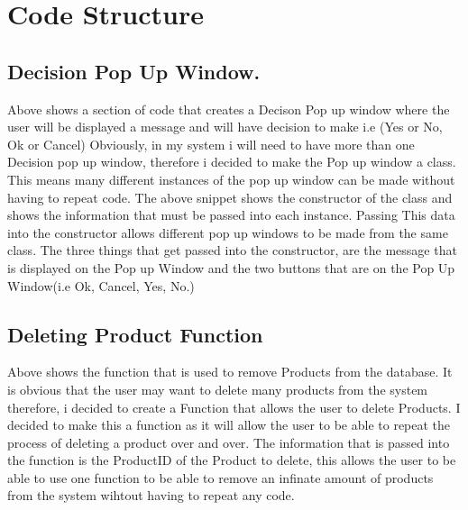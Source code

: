 \section{Code Structure}


\subsection{Decision Pop Up Window.}
\begin{figure}[H]
\end{figure}

Above shows a section of code that creates a Decison Pop up window where the user will be displayed a message and will have decision to make i.e (Yes or No, Ok or Cancel)
Obviously, in my system i will need to have more than one Decision pop up window, therefore i decided to make the Pop up window a class. This means many different instances of the pop up window can be made without having to repeat code. The above snippet shows the constructor of the class and shows the information that must be passed into each instance. Passing This data into the constructor allows different pop up windows to be made from the same class. The three things that get passed into the constructor, are the message that is displayed on the Pop up Window and the two buttons that are on the Pop Up Window(i.e Ok, Cancel, Yes, No.)

\subsection{Deleting Product Function}
\begin{figure}[H]
\end{figure}
 Above shows the function that is used to remove Products from the database. It is obvious that the user may want to delete many products from the system therefore, i decided to create a Function that allows the user to delete Products. I decided to make this a function as it will allow the user to be able to repeat the process of deleting a product over and over. The information that is passed into the function is the ProductID of the Product to delete, this allows the user to be able to use one function to be able to remove an infinate amount of products from the system wihtout having to repeat any code.

